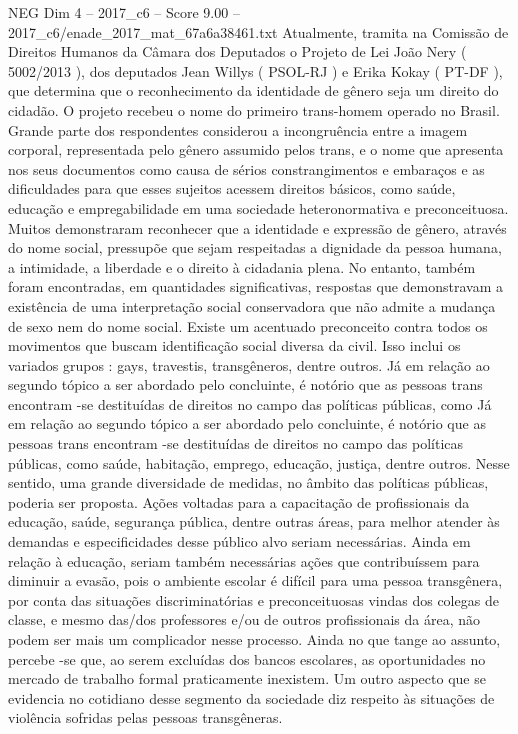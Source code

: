\begin{textsample}{NEG Dim 4 – 2017\_c6 – Score 9.00 – 2017\_c6/enade\_2017\_mat\_67a6a38461.txt}
Atualmente, tramita na Comissão de Direitos Humanos da Câmara dos Deputados o Projeto de Lei João Nery ( 5002/2013 ), dos deputados Jean Willys ( PSOL-RJ ) e Erika Kokay ( PT-DF ), que determina que o reconhecimento da identidade de gênero seja um direito do cidadão.
O projeto recebeu o nome do primeiro trans-homem operado no Brasil.
Grande parte dos respondentes considerou a incongruência entre a imagem corporal, representada pelo gênero assumido pelos trans, e o nome que apresenta nos seus documentos como causa de sérios constrangimentos e embaraços e as dificuldades para que esses sujeitos acessem direitos básicos, como saúde, educação e empregabilidade em uma sociedade heteronormativa e preconceituosa.
Muitos demonstraram reconhecer que a identidade e expressão de gênero, através do nome social, pressupõe que sejam respeitadas a dignidade da pessoa humana, a intimidade, a liberdade e o direito à cidadania plena.
No entanto, também foram encontradas, em quantidades significativas, respostas que demonstravam a existência de uma interpretação social conservadora que não admite a mudança de sexo nem do nome social.
Existe um acentuado preconceito contra todos os movimentos que buscam identificação social diversa da civil.
Isso inclui os variados grupos : gays, travestis, transgêneros, dentre outros.
Já em relação ao segundo tópico a ser abordado pelo concluinte, é notório que as pessoas trans encontram -se destituídas de direitos no campo das políticas públicas, como Já em relação ao segundo tópico a ser abordado pelo concluinte, é notório que as pessoas trans encontram -se destituídas de direitos no campo das políticas públicas, como saúde, habitação, emprego, educação, justiça, dentre outros.
Nesse sentido, uma grande diversidade de medidas, no âmbito das políticas públicas, poderia ser proposta.
Ações voltadas para a capacitação de profissionais da educação, saúde, segurança pública, dentre outras áreas, para melhor atender às demandas e especificidades desse público alvo seriam necessárias.
Ainda em relação à educação, seriam também necessárias ações que contribuíssem para diminuir a evasão, pois o ambiente escolar é difícil para uma pessoa transgênera, por conta das situações discriminatórias e preconceituosas vindas dos colegas de classe, e mesmo das/dos professores e/ou de outros profissionais da área, não podem ser mais um complicador nesse processo.
Ainda no que tange ao assunto, percebe -se que, ao serem excluídas dos bancos escolares, as oportunidades no mercado de trabalho formal praticamente inexistem.
Um outro aspecto que se evidencia no cotidiano desse segmento da sociedade diz respeito às situações de violência sofridas pelas pessoas transgêneras.

\end{textsample}
